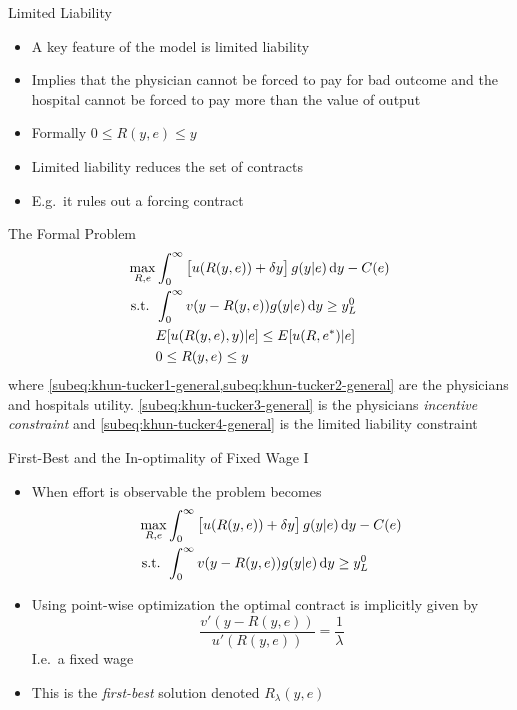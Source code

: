 \documentclass[compress]{beamer}
\begin{document}
\begin{frame}[c]{Limited Liability}
  \begin{itemize}[<+- | alert@+>]
    \item A key feature of the model is limited liability
    \item Implies that the physician cannot be forced to pay for bad outcome and the hospital cannot be forced to pay more than the value of output
    \item Formally $0\leq R(y,e) \leq y$
    \item Limited liability reduces the set of contracts
    \item E.g.\ it rules out a \citeauthor{Mirrlees1974Notes} forcing contract
  \end{itemize}
\end{frame}

\begin{frame}[c]{The Formal Problem}
  \begin{subequations}
    \label{eq:khun-tucker-general}
    \begin{align}
      \max_{R,e}   & \int_0^{\infty}\left[u(R(y,e))+\delta y\right]g(y|e)\dif y-C(e)\label{subeq:khun-tucker1-general} \\
      \text{s.t. } & \int_{0}^{\infty} v(y-R(y,e))g(y|e)\dif y\geq y_L^0 \label{subeq:khun-tucker2-general}            \\
                   & E[u(R(y,e),y)|e]\leq E[u(R,e^*)|e] \label{subeq:khun-tucker3-general}                             \\
                   & 0\leq R(y,e)\leq y \label{subeq:khun-tucker4-general}                                             
    \end{align}
  \end{subequations}
  where \cref{subeq:khun-tucker1-general,subeq:khun-tucker2-general} are the physicians and hospitals utility. \cref{subeq:khun-tucker3-general} is the physicians \emph{incentive constraint} and \cref{subeq:khun-tucker4-general} is the limited liability constraint
\end{frame}

\begin{frame}[c]{First-Best and the In-optimality of Fixed Wage I}
  \begin{itemize}[<+- | alert@+>]
    \item When effort is observable the problem becomes
          \begin{align*}
            \max_{R,e}   & \int_0^{\infty}\left[u(R(y,e))+\delta y\right]g(y|e)\dif y-C(e) \\
            \text{s.t. } & \int_{0}^{\infty} v(y-R(y,e))g(y|e)\dif y\geq y_L^0             
          \end{align*}
    \item Using point-wise optimization the optimal contract is implicitly given by 
          \[
            \frac{v'(y-R(y,e))}{u'(R(y,e))}=\frac{1}{\lambda}
          \]
          I.e.\ a fixed wage
    \item This is the \emph{first-best} solution denoted $R_\lambda(y,e)$
  \end{itemize}
\end{frame}
\end{document}
